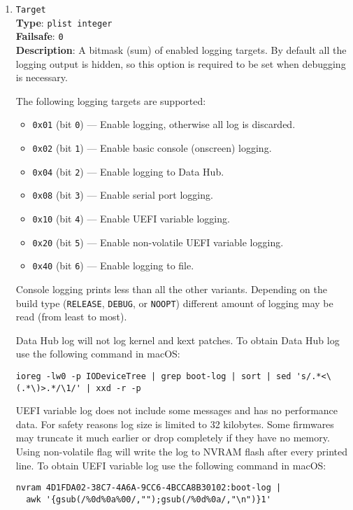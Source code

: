 \documentclass[]{article}
\providecommand{\tightlist}{%
  \setlength{\itemsep}{0pt}\setlength{\parskip}{0pt}}
\begin{document}
\begin{enumerate}
\item
  \texttt{Target}\\
  \textbf{Type}: \texttt{plist\ integer}\\
  \textbf{Failsafe}: \texttt{0}\\
  \textbf{Description}: A bitmask (sum) of enabled logging targets.
  By default all the logging output is hidden, so this option is
  required to be set when debugging is necessary.

  The following logging targets are supported:

  \begin{itemize}
  \tightlist
    \item \texttt{0x01} (bit \texttt{0}) --- Enable logging, otherwise all log is discarded.
    \item \texttt{0x02} (bit \texttt{1}) --- Enable basic console (onscreen) logging.
    \item \texttt{0x04} (bit \texttt{2}) --- Enable logging to Data Hub.
    \item \texttt{0x08} (bit \texttt{3}) --- Enable serial port logging.
    \item \texttt{0x10} (bit \texttt{4}) --- Enable UEFI variable logging.
    \item \texttt{0x20} (bit \texttt{5}) --- Enable non-volatile UEFI variable logging.
    \item \texttt{0x40} (bit \texttt{6}) --- Enable logging to file.
  \end{itemize}

  Console logging prints less than all the other variants.
  Depending on the build type (\texttt{RELEASE}, \texttt{DEBUG}, or
  \texttt{NOOPT}) different amount of logging may be read (from least to most).

  Data Hub log will not log kernel and kext patches. To obtain Data Hub log use
  the following command in macOS:
\begin{lstlisting}[label=dhublog, style=ocbash]
ioreg -lw0 -p IODeviceTree | grep boot-log | sort | sed 's/.*<\(.*\)>.*/\1/' | xxd -r -p
\end{lstlisting}

  UEFI variable log does not include some messages and has no performance data. For safety
  reasons log size is limited to 32 kilobytes. Some firmwares may truncate it much earlier
  or drop completely if they have no memory. Using non-volatile flag will write the log to
  NVRAM flash after every printed line. To obtain UEFI variable log use the following command
  in macOS:
\begin{lstlisting}[label=nvramlog, style=ocbash]
nvram 4D1FDA02-38C7-4A6A-9CC6-4BCCA8B30102:boot-log |
  awk '{gsub(/%0d%0a%00/,"");gsub(/%0d%0a/,"\n")}1'
\end{lstlisting}


\end{enumerate}
\end{document}
